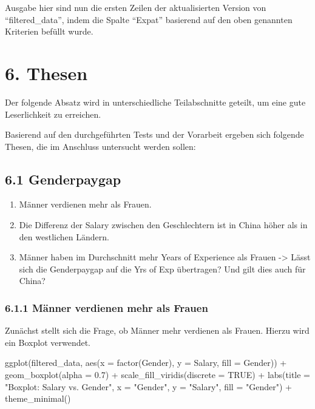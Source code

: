 \documentclass[
  letterpaper,
  DIV=11,
  numbers=noendperiod]{scrartcl}
\newenvironment{Shaded}{\begin{snugshade}}{\end{snugshade}}
\newcommand{\AttributeTok}[1]{\textcolor[rgb]{0.40,0.45,0.13}{#1}}
\newcommand{\ConstantTok}[1]{\textcolor[rgb]{0.56,0.35,0.01}{#1}}
\newcommand{\FloatTok}[1]{\textcolor[rgb]{0.68,0.00,0.00}{#1}}
\newcommand{\FunctionTok}[1]{\textcolor[rgb]{0.28,0.35,0.67}{#1}}
\newcommand{\NormalTok}[1]{\textcolor[rgb]{0.00,0.23,0.31}{#1}}
\newcommand{\SpecialCharTok}[1]{\textcolor[rgb]{0.37,0.37,0.37}{#1}}
\newcommand{\StringTok}[1]{\textcolor[rgb]{0.13,0.47,0.30}{#1}}
\providecommand{\tightlist}{%
  \setlength{\itemsep}{0pt}\setlength{\parskip}{0pt}}\usepackage{longtable,booktabs,array}
\begin{document}
Ausgabe hier sind nun die ersten Zeilen der aktualisierten Version von
``filtered\_data'', indem die Spalte ``Expat'' basierend auf den oben
genannten Kriterien befüllt wurde.

\hypertarget{thesen}{%
\section{6. Thesen}\label{thesen}}

Der folgende Absatz wird in unterschiedliche Teilabschnitte geteilt, um
eine gute Leserlichkeit zu erreichen.

Basierend auf den durchgeführten Tests und der Vorarbeit ergeben sich
folgende Thesen, die im Anschluss untersucht werden sollen:

\hypertarget{genderpaygap}{%
\subsection{6.1 Genderpaygap}\label{genderpaygap}}

\begin{enumerate}
\def\labelenumi{\arabic{enumi}.}
\tightlist
\item
  Männer verdienen mehr als Frauen.
\item
  Die Differenz der Salary zwischen den Geschlechtern ist in China höher
  als in den westlichen Ländern.
\item
  Männer haben im Durchschnitt mehr Years of Experience als Frauen
  -\textgreater{} Lässt sich die Genderpaygap auf die Yrs of Exp
  übertragen? Und gilt dies auch für China?
\end{enumerate}

\hypertarget{muxe4nner-verdienen-mehr-als-frauen}{%
\subsubsection{6.1.1 Männer verdienen mehr als
Frauen}\label{muxe4nner-verdienen-mehr-als-frauen}}

Zunächst stellt sich die Frage, ob Männer mehr verdienen als Frauen.
Hierzu wird ein Boxplot verwendet.

\begin{Shaded}
\begin{Highlighting}[]
\FunctionTok{ggplot}\NormalTok{(filtered\_data, }\FunctionTok{aes}\NormalTok{(}\AttributeTok{x =} \FunctionTok{factor}\NormalTok{(Gender), }\AttributeTok{y =}\NormalTok{ Salary, }\AttributeTok{fill =}\NormalTok{ Gender)) }\SpecialCharTok{+}
  \FunctionTok{geom\_boxplot}\NormalTok{(}\AttributeTok{alpha =} \FloatTok{0.7}\NormalTok{) }\SpecialCharTok{+}
  \FunctionTok{scale\_fill\_viridis}\NormalTok{(}\AttributeTok{discrete =} \ConstantTok{TRUE}\NormalTok{) }\SpecialCharTok{+}
  \FunctionTok{labs}\NormalTok{(}\AttributeTok{title =} \StringTok{"Boxplot: Salary vs. Gender"}\NormalTok{,}
       \AttributeTok{x =} \StringTok{"Gender"}\NormalTok{,}
       \AttributeTok{y =} \StringTok{"Salary"}\NormalTok{,}
       \AttributeTok{fill =} \StringTok{"Gender"}\NormalTok{) }\SpecialCharTok{+}
  \FunctionTok{theme\_minimal}\NormalTok{()}
\end{Highlighting}
\end{Shaded}
\end{document}
